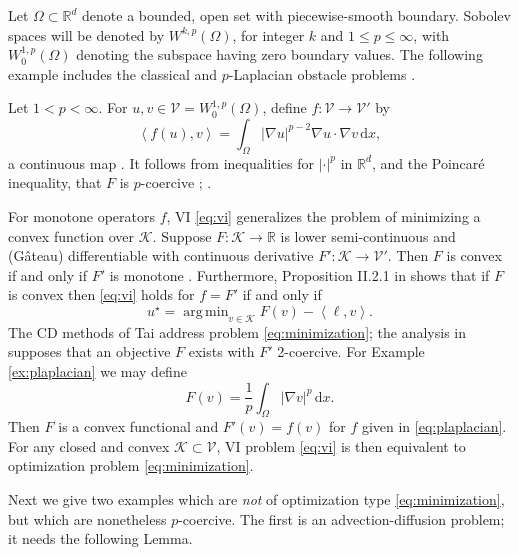 \documentclass[review,hidelinks,onefignum,onetabnum]{siamart220329}
\newcommand{\RR}{\mathbb{R}}
\newcommand{\grad}{\nabla}
\newcommand{\cK}{\mathcal{K}}
\newcommand{\cV}{\mathcal{V}}
\newcommand{\ip}[2]{\left<#1,#2\right>}
\newcommand{\dx}{\, \mathrm{d}x}
\DeclareMathOperator*{\argmin}{arg\,min}
\begin{document}
Let $\Omega \subset \RR^d$ denote a bounded, open set with piecewise-smooth boundary.  Sobolev spaces \cite{Evans2010} will be denoted by $W^{k,p}(\Omega)$, for integer $k$ and $1\le p \le \infty$, with $W^{1,p}_0(\Omega)$ denoting the subspace having zero boundary values.  The following example includes the classical and $p$-Laplacian obstacle problems \cite{ChoeLewis1991}.

\begin{example}  \label{ex:plaplacian}  Let $1<p<\infty$.  For $u,v \in \cV = W^{1,p}_0(\Omega)$, define $f:\cV \to \cV'$ by
\begin{equation}
\ip{f(u)}{v} = \int_\Omega |\grad u|^{p-2} \grad u \cdot \grad v\dx, \label{eq:plaplacian}
\end{equation}
a continuous map \cite[Theorem A.0.6]{Peral1997}.  It follows from inequalities for $|\cdot|^p$ in $\RR^d$, and the Poincar\'e inequality, that $F$ is $p$-coercive \cite{ChoeLewis1991}; \cite[Appendix A]{Bueler2021conservation}.  \end{example}

For monotone operators $f$, VI \eqref{eq:vi} generalizes the problem of minimizing a convex function over $\cK$.  Suppose $F:\cK \to \RR$ is lower semi-continuous and (G\^ateau) differentiable with continuous derivative $F':\cK \to \cV'$.  Then $F$ is convex if and only if $F'$ is monotone \cite[Proposition I.5.5]{EkelandTemam1976}.  Furthermore, Proposition II.2.1 in \cite{EkelandTemam1976} shows that if $F$ is convex then \eqref{eq:vi} holds for $f=F'$ if and only if
\begin{equation}
u^\star = \argmin_{v\in\cK} F(v) - \ip{\ell}{v}. \label{eq:minimization}
\end{equation}
The CD methods of Tai \cite{Tai2003} address problem \eqref{eq:minimization}; the analysis in \cite{Tai2003} supposes that an objective $F$ exists with $F'$ 2-coercive.  For Example \ref{ex:plaplacian} we may define
\begin{equation}
F(v) = \frac{1}{p} \int_\Omega |\grad v|^p\dx. \label{eq:plaplacianobjective}
\end{equation}
Then $F$ is a convex functional and $F'(v) = f(v)$ for $f$ given in \eqref{eq:plaplacian}.  For any closed and convex $\cK\subset \cV$, VI problem \eqref{eq:vi} is then equivalent to optimization problem \eqref{eq:minimization}.

Next we give two examples which are \emph{not} of optimization type \eqref{eq:minimization}, but which are nonetheless $p$-coercive.  The first is an advection-diffusion problem; it needs the following Lemma.
\end{document}
